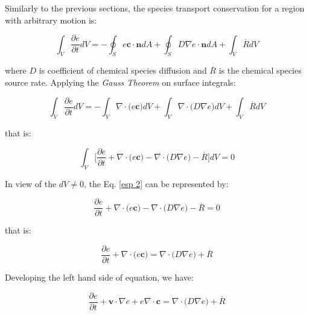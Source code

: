 Similarly to the previous sections, 
the species transport conservation
for a region with arbitrary motion is:


\begin{equation}
 \int_{V} \frac{\partial e}{\partial t} dV
 = 
 - 
 \oint_{S} e \textbf{c} \cdot \textbf{n} dA
 +
 \oint_{S} D \nabla e \cdot \textbf{n} dA
 +
 \int_{V} \overset{.}{R} dV
\end{equation}

\medskip
\noindent
where $D$ is coefficient of chemical species diffusion and 
$\overset{.}{R}$ is the chemical species source rate.
Applying the \textit{Gauss Theorem} on surface integrals:

\begin{equation}
 \int_{V} \frac{\partial e}{\partial t} dV
 = 
 - 
 \int_{V} \nabla \cdot \big( e \textbf{c} \big) dV
 +
 \int_{V} \nabla \cdot \big( D \nabla e \big) dV
 +
 \int_{V} \overset{.}{R} dV
\end{equation}

\medskip
\noindent
that is:

\begin{equation} \label{esp 2}
 \int_{V} \Bigg[ \frac{\partial e}{\partial t}
 + 
 \nabla \cdot \big( e \textbf{c} \big)
 -
 \nabla \cdot \big( D \nabla e \big)
 -
 \overset{.}{R} \Bigg] dV = 0
\end{equation}



\medskip
\noindent
In view of the $dV \neq 0$,
the Eq. \ref{esp 2} can be represented by:

\begin{equation}
 \frac{\partial e}{\partial t}
 + 
 \nabla \cdot \big( e \textbf{c} \big)
 -
 \nabla \cdot \big( D \nabla e \big)
 -
 \overset{.}{R} = 0
\end{equation}



\medskip
\noindent
that is:

\begin{equation}
 \frac{\partial e}{\partial t}
 +
 \nabla \cdot \big( e \textbf{c} \big)
 =
 \nabla \cdot \big( D \nabla e \big)
 +
 \overset{.}{R}
\end{equation}

\medskip
\noindent
Developing the left hand side of equation, we have:

\begin{equation}
 \frac{\partial e}{\partial t}
 +
 \textbf{v} \cdot \nabla e
 + 
 e \nabla \cdot \textbf{c}
 =
 \nabla \cdot \big( D \nabla e \big)
 +
 \overset{.}{R}
\end{equation}

